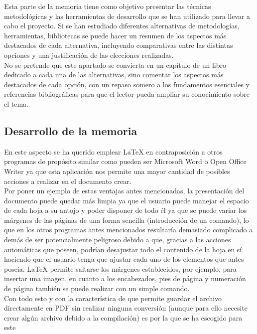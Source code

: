 
Esta parte de la memoria tiene como objetivo presentar las técnicas metodológicas y las herramientas de desarrollo que se han utilizado para llevar a cabo el proyecto. Si se han estudiado diferentes alternativas de metodologías, herramientas, bibliotecas se puede hacer un resumen de los aspectos más destacados de cada alternativa, incluyendo comparativas entre las distintas opciones y una justificación de las elecciones realizadas. \\

No se pretende que este apartado se convierta en un capítulo de un libro dedicado a cada una de las alternativas, sino comentar los aspectos más destacados de cada opción, con un repaso somero a los fundamentos esenciales y referencias bibliográficas para que el lector pueda ampliar su conocimiento sobre el tema.


\subsection{Desarrollo de la memoria}

En este aspecto se ha querido emplear LaTeX en contraposición a otros programas de propósito similar como pueden ser Microsoft Word o Open Office Writer ya que esta aplicación nos permite una mayor cantidad de posibles acciones a realizar en el documento crear. \\

Por poner un ejemplo de estas ventajas antes mencionadas, la presentación del documento puede quedar más limpia ya que el usuario puede manejar el espacio de cada hoja a su antojo y poder disponer de todo él ya que se puede variar los márgenes de las páginas de una forma sencilla (introducción de un comando), lo que en los otros programas antes mencionados resultaría demasiado complicado a demás de ser potencialmente peligroso debido a que, gracias a las acciones automáticas que poseen, podrían desajustar todo el contenido de la hoja en sí haciendo que el usuario tenga que ajustar cada uno de los elementos que antes poseía. LaTeX permite saltarse los márgenes establecidos, por ejemplo, para insertar una imagen. en cuanto a los encabezados, pies de página y numeración de página también se puede realizar con un simple comando. \\

Con todo esto y con la característica de que permite guardar el archivo directamente en PDF sin realizar ninguna conversión (aunque para ello necesite crear algún archivo debido a la compilación) es por la que se ha escogido para este 


